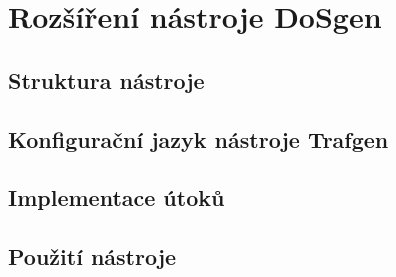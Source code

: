 \chapter{Rozšíření nástroje DoSgen}

\section{Struktura nástroje}

\section{Konfigurační jazyk nástroje Trafgen}

\section{Implementace útoků}

\section{Použití nástroje}
